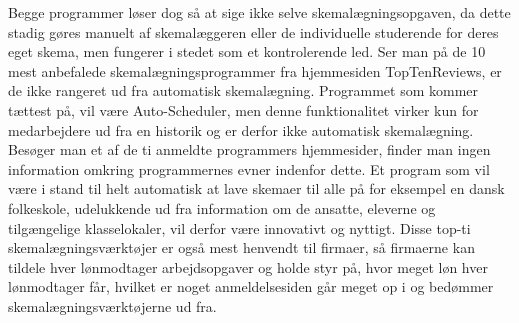Begge programmer løser dog så at sige ikke selve skemalægningsopgaven, da dette stadig gøres manuelt af skemalæggeren eller de individuelle studerende for deres eget skema, men fungerer i stedet som et kontrolerende led. Ser man på de 10 mest anbefalede skemalægningsprogrammer fra hjemmesiden TopTenReviews\cite{top10Schedulers}, er de ikke rangeret ud fra automatisk skemalægning. Programmet som kommer tættest på, vil være Auto-Scheduler, men denne funktionalitet virker kun for medarbejdere ud fra en historik og er derfor ikke automatisk skemalægning. Besøger man et af de ti anmeldte programmers hjemmesider, finder man ingen information omkring programmernes evner indenfor dette. Et program som vil være i stand til helt automatisk at lave skemaer til alle på for eksempel en dansk folkeskole, udelukkende ud fra information om de ansatte, eleverne og tilgængelige klasselokaler, vil derfor være innovativt og nyttigt. Disse top-ti skemalægningsværktøjer er også mest henvendt til firmaer, så firmaerne kan tildele hver lønmodtager arbejdsopgaver og holde styr på, hvor meget løn hver lønmodtager får, hvilket er noget anmeldelsesiden går meget op i og bedømmer skemalægningsværktøjerne ud fra.

